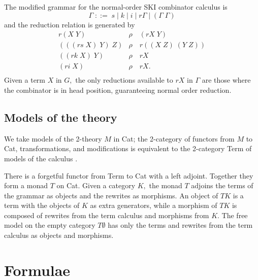 \documentclass[]{acm_proc_article-sp}
\numberwithin{equation}{subsection}
\begin{document}
The modified grammar for the normal-order SKI combinator calculus is
\[ \Gamma\; ::=\; s\; |\; k\; |\; i\; |\; r\Gamma\; |\; (\Gamma\; \Gamma) \]
and the reduction relation is generated by
\[\begin{array}{rl}
  r(X\; Y)  & \rho\quad (rX\; Y) \\
  (((rs\; X)\; Y)\; Z) & \rho\quad r((X\; Z)\; (Y\; Z))\\
  ((rk\; X)\; Y) & \rho\quad rX\\
  (ri\; X)  & \rho\quad rX.\\
\end{array}\]
Given a term $X$ in $G,$ the only reductions available to $rX$ in $\Gamma$ are those where the combinator is in head position, guaranteeing normal order reduction.

\subsection{Models of the theory}

We take models of the 2-theory $M$ in Cat; the 2-category of functors
from $M$ to Cat, transformations, and modifications is equivalent to
the 2-category Term of models of the calculus \cite{somebody}.

There is a forgetful functor from Term to Cat with a left adjoint.
Together they form a monad $T$ on Cat.  Given a category $K,$ the
monad $T$ adjoins the terms of the grammar as objects and the
rewrites as morphisms.  An object of $TK$ is a term with the objects
of $K$ as extra generators, while a morphism of $TK$ is composed
of rewrites from the term calculus and morphisms from $K$. The
free model on the empty category $T\emptyset$ has only the terms
and rewrites from the term calculus as objects and morphisms.

\section{Formulae}
\end{document}
